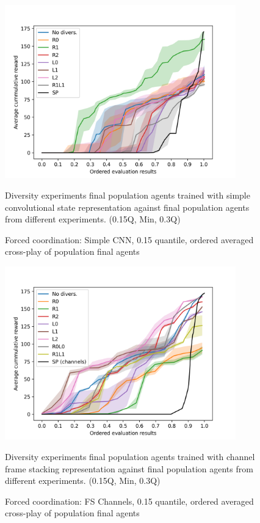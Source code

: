 \begin{figure}[!ht]
    \centering
    \includegraphics*[width=10cm]{../img/FinalPopFinalPopSimpleCnnQ15.png}

    \caption{Forced coordination: Simple CNN, 0.15 quantile, ordered averaged cross-play of population final agents}
    \label{FinalPopFinalPopSimpleCnnQ15}
    \medskip
    \small 
    Diversity experiments final population agents trained with simple convolutional state representation against final population agents from different experiments.
    (0.15Q, Min, 0.3Q)

\end{figure}

\begin{figure}[!ht]
    \centering
    \includegraphics*[width=10cm]{../img/FinalPopFinalPopFsChannelsQ15.png}

    \caption{Forced coordination: FS Channels, 0.15 quantile, ordered averaged cross-play of population final agents}
    \label{FinalPopFinalPopFsChannelsQ15}
    \medskip
    \small 
    Diversity experiments final population agents trained with channel frame stacking representation against final population agents from different experiments.
    (0.15Q, Min, 0.3Q)

\end{figure}

